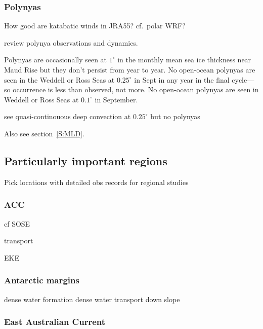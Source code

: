 \documentclass[11pt]{article}
\newcommand{\CONTRIBUTORS}[1]{\note{\textcolor{BurntOrange}{\textsf{\textsl{CONTRIBUTORS: #1}}}}}
\begin{document}
\subsubsection{Polynyas}\label{S:polynyas}
How good are katabatic winds in JRA55? cf.\ polar WRF?

\citet{Morales-Maqueda2004a} review polynya observations and dynamics.

\citet{UotilaOFarrellMarslandBi2013a}
\citet{KwokHunkeMaslowskiMenemenlisZhang2008a}

Polynyas are occasionally seen at $1^\circ$ in the monthly mean sea ice thickness near Maud Rise but they don't persist from year to year.
No open-ocean polynyas are seen in the Weddell or Ross Seas at $0.25^\circ$ in Sept in any year in the final cycle---so occurrence is less than observed, not more.
No open-ocean polynyas are seen in Weddell or Ross Seas at $0.1^\circ$ in September.

\citet{DufourMorrisonGriffiesFrengerZanowskiWinton2017a} see quasi-continouous deep convection at $0.25^\circ$ but no polynyas

Also see section~\ref{S:MLD}.

\FloatBarrier

\subsection{Particularly important regions}
Pick locations with detailed obs records for regional studies

\subsubsection{ACC}
\citet{Rintoul2018a}

cf SOSE \citet{MazloffHeimbachWunsch2010a}

transport

EKE
\citet{FarnetiDownesGriffiesMarslandBehrensBentsenBiBiastochBoning2015a}

\subsubsection{Antarctic margins}
\CONTRIBUTORS{Adele Morrison}

dense water formation
dense water transport down slope

\subsubsection{East Australian Current}
\citet{LaurindoMarianoLumpkin2017a}
\citet{ArcherRoughanKeatingSchaeffer2017a, ArcherShayJohns2017a, ArcherKeatingRoughanJohnsLumpkinBeron-VeraShay2018a}
\citet{WijeratnePattiaratchiProctor2018a}
\citet{ZilbermanRoemmichGilleGilson2018a, ZilbermanRoemmichGille2014a}
\citet{FengZhangOkeMonselesanChamberlainMatearSchiller2016a}
\citet{SloyanRidgwayCowley2016a}
\end{document}
